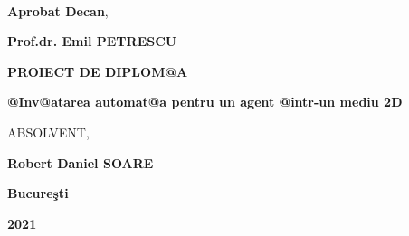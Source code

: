 \documentclass[11pt,twoside]{book}
\begin{document}
~~~

\begin{flushright}
{\bf Aprobat Decan},

\vspace{0.2cm}

{\bf Prof.dr. Emil PETRESCU}
\end{flushright}

\vspace{2cm}

\centerline{\huge \bf PROIECT DE DIPLOM@A}

\vspace{1.5cm}

\centerline{\Large \bf @Inv@atarea automat@a pentru un agent @intr-un mediu 2D} \vspace{0.35cm}


\vspace{3cm}

 \hfill {ABSOLVENT,}

 \hfill{\bf  Robert Daniel SOARE}

\vspace{3cm}

\centerline{\bf Bucure\c sti}

\vspace{0.5cm}

\centerline{\bf 2021}

\newpage

\setcounter{page}{3}
\tableofcontents
{}


\printindex  {} \thispagestyle{empty}

\end{document}
